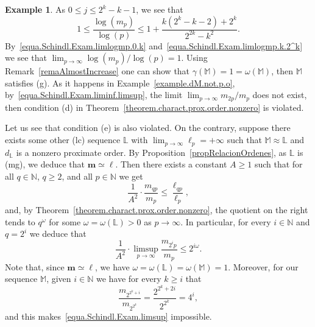 \documentclass[11pt,a4paper]{article}
\theoremstyle{definition}
\newtheorem{exam}[theo]{Example}
\def\oo{\infty}
\def\ri{\rightarrow}
\def\o{\omega}
\def\bl{\boldsymbol{\ell}}
\def\N{\mathbb{N}}
\def\M{\mathbb{M}}
\def\L{\mathbb{L}} %
\def\bm{\boldsymbol{m}}
\begin{document}
\begin{exam}
As $0\le j\le 2^k -k-1$, we see that
\begin{equation}\label{equa.Schindl.Exam.limlogmp.k.2^k}
1\le\frac{\log(m_p)}{\log(p)}\le1+\frac{k(2^k-k-2)+2^k}{2^{2k}-k^2 }.
\end{equation}
By~\eqref{equa.Schindl.Exam.limlogmp.0.k} and~\eqref{equa.Schindl.Exam.limlogmp.k.2^k} we see that
$\lim_{p\to\oo}\log(m_p)/\log(p)=1$. Using Remark~\ref{remaAlmostIncrease} one can show that $\gamma(\M)=1=\o(\M)$, then $\M$ satisfies (g).
As it happens in Example~\ref{example.dM.not.p.o},
by~\eqref{equa.Schindl.Exam.liminf.limsup}, the limit $\lim_{p\ri\oo}m_{2p}/m_p$
does not exist, then condition (d) in Theorem~\ref{theorem.charact.prox.order.nonzero} is violated.

Let us see that
condition (e) is also violated. On the contrary, suppose there exists
some other
(lc) sequence $\L$ with $\lim_{p\rightarrow\infty}\ell_p=+\infty$ such that $\M\approx\L$ and $d_{\L}$ is a nonzero proximate order.
By Proposition~\ref{propRelacionOrdenes}, as $\L$ is
(mg), we deduce that $\bm\simeq\bl$. Then there exists a constant $A\ge 1$ such that for all $q\in\N$, $q\ge 2$, and all
$p\in\N$ we get
$$\frac{1}{A^2}\cdot\frac{m_{qp}}{m_p}\le\frac{\ell_{qp}}{\ell_p},$$
and, by Theorem~\ref{theorem.charact.prox.order.nonzero}, the quotient on the right tends to $q^{\omega}$ for some $\omega=\omega(\L)>0$ as $p\rightarrow\infty$. In particular,
for every $i\in\N$ and $q=2^i$ we deduce that
\begin{equation}\label{equa.Schindl.Exam.limsup}
\frac{1}{A^2}\cdot\limsup_{p\rightarrow\infty}\frac{m_{2^ip}}{m_p}\le 2^{i\o}.
\end{equation}
Note that, since  $\bm\simeq\bl$, we have $\o=\o(\L)=\o(\M)=1$.
Moreover, for our sequence $\M$, given $i\in\N$ we have
for every $k\geq i$ that
$$\frac{m_{2^{{2^k}+ i}}}{m_{2^{2^k}}}=\frac{2^{2^k+2i}}{2^{2^k}}=4^i,$$
and this makes~\eqref{equa.Schindl.Exam.limsup} impossible.
\end{exam}
\end{document}
